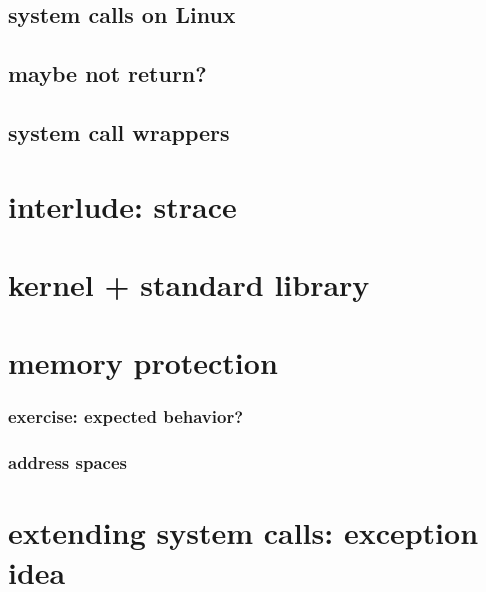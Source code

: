 \subsection{system calls on Linux}


\subsection{maybe not return?}



\subsection{system call wrappers}

% 

\section{interlude: strace}


\section{kernel + standard library}

\section{memory protection}

\subsubsection{exercise: expected behavior?}


%

\subsubsection{address spaces}


\section{extending system calls: exception idea}


